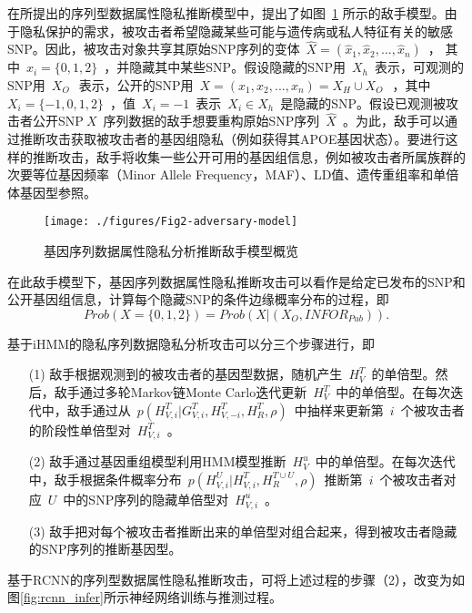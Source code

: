 \documentclass[pdftex,notypeinfo,twoside,openany,UTF8,fntef]{CASthesis}
\theoremstyle{THrm}{
	\newtheorem{question}{Question}[section]
	\newtheorem{property}{性质}[section]
	\newtheorem{assumption}{假设}[section]
	\newtheorem{claim}[lemma]{断言}
	
}
\begin{document}
在所提出的序列型数据属性隐私推断模型中，提出了如图~\ref{fig:adversary-model} 所示的敌手模型。由于隐私保护的需求，被攻击者希望隐藏某些可能与遗传病或私人特征有关的敏感SNP。因此，被攻击对象共享其原始SNP序列的变体~$\hat{X}=(\hat{x}_1,\hat{x}_2, ... , \hat{x}_n)$~， 其中~$\hat{x}_i =\{0,1,2\}$~，并隐藏其中某些SNP。假设隐藏的SNP用~$X_h$~表示，可观测的SNP用~$X_O~$~表示，公开的SNP用~$X=(x_1, x_2, ..., x_n)=X_H \cup X_O~$~，其中~$X_i =\{-1,0,1,2\}$~，值~$X_i=-1$~表示~$X_i\in X_h$~是隐藏的SNP。假设已观测被攻击者公开SNP$~X$~序列数据的敌手想要重构原始SNP序列~$\hat{X}$~。为此，敌手可以通过推断攻击获取被攻击者的基因组隐私（例如获得其APOE基因状态）。要进行这样的推断攻击，敌手将收集一些公开可用的基因组信息，例如被攻击者所属族群的次要等位基因频率（Minor Allele Frequency，MAF）、LD值、遗传重组率和单倍体基因型参照。

\begin{figure}[htbp]
	\centering
	\texttt{[image: ./figures/Fig2-adversary-model]}
	\caption{基因序列数据属性隐私分析推断敌手模型概览}
	\label{fig:adversary-model}
\end{figure}

在此敌手模型下，基因序列数据属性隐私推断攻击可以看作是给定已发布的SNP和公开基因组信息，计算每个隐藏SNP的条件边缘概率分布的过程，即
\begin{equation}
Prob(X=\{0,1,2\})=Prob(X|(X_O,{INFOR}_{Pub})).
\end{equation}

基于iHMM的隐私序列数据隐私分析攻击可以分三个步骤进行，即

\begin{enumerate}
	\item[(1)] 敌手根据观测到的被攻击者的基因型数据，随机产生~$H_V^T$~的单倍型。然后，敌手通过多轮Markov链Monte Carlo迭代更新~$H_V^T$~中的单倍型。在每次迭代中，敌手通过从~$p(H_{V,i}^T|G_{V,i}^T,H_{V,-i}^T,H_R^T,\rho)$~中抽样来更新第~$i$~个被攻击者的阶段性单倍型对~$H_{V,i}^T$~。
	\item[(2)] 敌手通过基因重组模型利用HMM模型推断~$H_V^u$~中的单倍型。在每次迭代中，敌手根据条件概率分布~$p(H_{V,i}^U|H_{V,i}^T, H_R^{T \cup U},\rho)$~推断第~$i$~个被攻击者对应~$U$~中的SNP序列的隐藏单倍型对~$H_{V,i}^u$~。
	\item[(3)] 敌手把对每个被攻击者推断出来的单倍型对组合起来，得到被攻击者隐藏的SNP序列的推断基因型。
\end{enumerate}

基于RCNN的序列型数据属性隐私推断攻击，可将上述过程的步骤（2），改变为如图\ref{fig:rcnn_infer}所示神经网络训练与推测过程。
\end{document}
